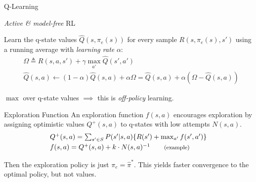 \documentclass{cognito}
\begin{document}

\begin{note}{Q-Learning}
	\begin{mdframed}[linecolor=black!25!white]
		\emph{Active \& model-free} RL
	\end{mdframed}
	Learn the q-state values $\hat{Q}(s, \pi_e(s))$ for every sample $R(s, \pi_e(s), s')$ using
	a running average with \emph{learning rate} $\alpha$:
	\begin{align*}
		&\textstyle \Omega \triangleq R(s, a, s') + \gamma \max_{a'} \hat{Q}(s',a')\\
		&\textstyle \hat{Q}(s,a) \leftarrow (1 - \alpha) \hat{Q}(s,a) + \alpha \Omega = \hat{Q}(s,a) + \alpha ( \Omega - \hat{Q}(s,a))
	\end{align*}
	\begin{remark} $\max$ over q-state values $\implies$ this is \emph{off-policy} learning.
	\end{remark}
	\vspace{-5pt}
\end{note}


\begin{note}{Exploration Function}
	An exploration function $f(s, a)$ encourages exploration by
	assigning optimistic values $Q^+(s,a)$ to q-states with low attempts $N(s,a)$.
	\begin{align*}
		& \textstyle Q^+(s,a) = \sum_{s' \in S} P(s' | s, a) \{ R(s') + \max_{a'} f(s', a') \} \\
		& \textstyle f(s,a) = Q^+(s,a) + k \cdot N(s,a)^{-1} \quad\quad \text{\footnotesize(example)}
	\end{align*}
	\begin{remark} Then the exploration policy is just $\pi_e = \hat{\pi}^*$.
		This yields faster convergence to the optimal policy, but not values.
	\end{remark}\vspace{-5pt}
\end{note}
\end{document}
